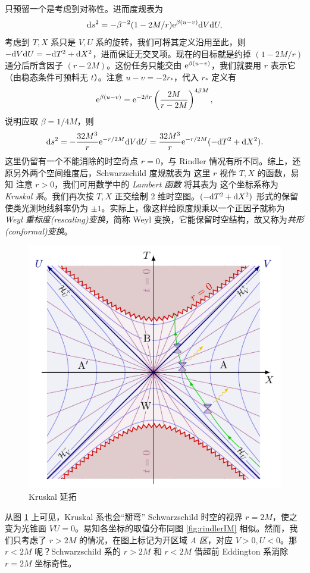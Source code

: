 只预留一个是考虑到对称性。进而度规表为
\[
\dd s^2=-\beta^{-2} (1-2M/r) \mathrm{e}^{\beta(u-v)} \dd V\dd U,
\]
考虑到 $T,X$ 系只是 $V,U$ 系的旋转，我们可将其定义沿用至此，则 $-\dd V\dd U=-\dd T^2+\dd X^2$，进而保证无交叉项。现在的目标就是约掉 $(1-2M/r)$ 通分后所含因子 $(r-2M)$。这份任务只能交由 $\mathrm{e}^{\beta(u-v)}$，我们就要用 $r$ 表示它（由稳态条件可预料无 $t$）。注意 $u-v=-2r_*$，代入 $r_*$ 定义有
\[
\mathrm{e}^{\beta(u-v)}=\mathrm{e}^{-2\beta r}\left(\frac{2M}{r-2M}\right)^{4\beta M},
\]
说明应取 $\beta=1/4M$，则
\[
\dd s^2=-\frac{32M^3}{r}\mathrm{e}^{-r/2M}\dd V\dd U=\frac{32M^3}{r}\mathrm{e}^{-r/2M}(-\dd T^2+\dd X^2).
\]
这里仍留有一个不能消除的时空奇点 $r=0$，与 Rindler 情况有所不同。综上，还原另外两个空间维度后，Schwarzschild 度规就表为
这里 $r$ 视作 $T,X$ 的函数，易知
注意 $r>0$，我们可用数学中的 \textit{Lambert 函数}
将其表为
这个坐标系称为 \textit{Kruskal 系}。我们再次按 $T,X$ 正交绘制 2 维时空图。$(-\dd T^2+\dd X^2)$ 形式的保留使类光测地线斜率仍为 $\pm 1$。实际上，像这样给原度规乘以一个正因子就称为 \textit{Weyl 重标度(rescaling)变换}，简称 Weyl 变换，它能保留时空结构，故又称为\textit{共形(conformal)变换}。
\begin{figure}[h!]
    \centering
    \includegraphics[width=.6\textwidth]{fig/chpt02/kruskal.pdf}
    \caption{Kruskal 延拓}
    \label{fig:kruskal}
\end{figure}
从图 \ref{fig:kruskal} 上可见，Kruskal 系也会“掰弯” Schwarzschild 时空的视界 $r=2M$，使之变为光锥面 $VU=0$。易知各坐标的取值分布同图 \ref{fig:rindlerIM} 相似。然而，我们只考虑了 $r>2M$ 的情况，在图上标记为开区域 \textit{A 区}，对应 $V>0,U<0$。那 $r<2M$ 呢？Schwarzschild 系的 $r>2M$ 和 $r<2M$ 借超前 Eddington 系消除 $r=2M$ 坐标奇性。
